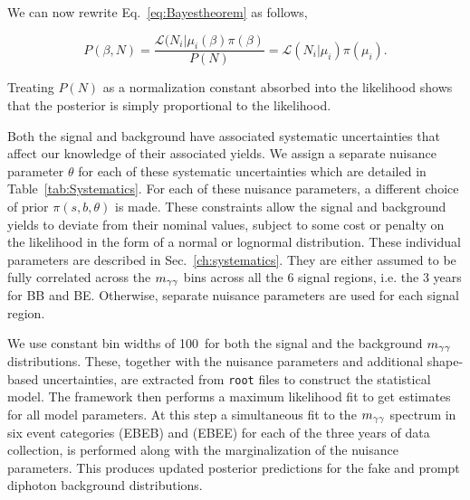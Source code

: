 We can now rewrite Eq.~\ref{eq:Bayestheorem} as follows,

\begin{equation} \label{eq:posterior}
P(\beta, N) = \frac{\mathcal{L}(N_i| \mu_{i} (\beta) \pi(\beta)}{P(N)} = \mathcal{L}(N_i| \mu_i) \pi(\mu_i).
\end{equation}

Treating $P(N)$ as a normalization constant absorbed into the likelihood shows that the posterior is simply proportional to the likelihood.

Both the signal and background have associated systematic uncertainties that affect our knowledge of their associated yields. We assign a separate nuisance parameter $\theta$ for each of these systematic uncertainties which are detailed in Table~\ref{tab:Systematics}. For each of these nuisance parameters, a different choice of prior $\pi(s,b, \theta)$ is made. These constraints allow the signal and background yields to deviate from their nominal values, subject to some cost or penalty on the likelihood in the form of a normal or lognormal distribution. These  individual parameters are described in Sec.~\ref{ch:systematics}. They are either assumed to be fully correlated across the $m_{\gamma\gamma}$ bins across all the 6 signal regions, i.e. the 3 years for BB and BE. Otherwise, separate nuisance parameters are used for each signal region. 

We use constant bin widths of 100~\GeV for both the signal and the background $m_{\gamma\gamma}$ distributions. These, together with the nuisance parameters and additional shape-based uncertainties, are extracted from \texttt{root} files to construct the statistical model. The framework then performs a maximum likelihood fit to get estimates for all model parameters. At this step a simultaneous fit to the $m_{\gamma\gamma}$ spectrum in six event categories (EBEB) and (EBEE) for each of the three years of data collection, is performed along with the marginalization of the nuisance parameters. This produces updated posterior predictions for the fake and prompt diphoton background distributions. 


